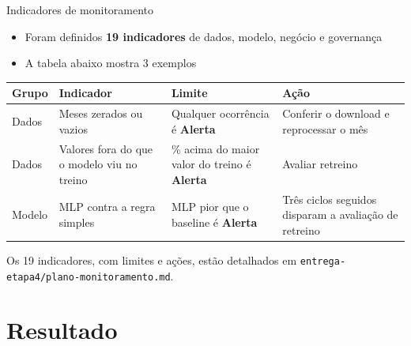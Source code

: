 \documentclass[aspectratio=169,10pt]{beamer}
\newcommand{\chave}[1]{\textcolor{dcblue}{\textbf{#1}}}
\newcommand{\nota}[1]{{\color{dcgreydark}\scriptsize #1\par}}
\newcommand{\alerta}{\textcolor{nivelalerta}{\textbf{Alerta}}}
\begin{document}
\begin{frame}{Indicadores de monitoramento}
  \vfill
  \setlength{\leftmargini}{0.9em}
  \begin{itemize}
    \setlength{\itemsep}{4pt}
    \item Foram definidos \chave{19 indicadores} de dados, modelo, negócio e governança
    \item A tabela abaixo mostra 3 exemplos
  \end{itemize}
  \vfill
  \small
  \renewcommand{\arraystretch}{1.4}
  \begin{tabular}{@{}l>{\raggedright\arraybackslash}p{}>{\raggedright\arraybackslash}p{}>{\raggedright\arraybackslash}p{}@{}}
    \toprule
    \textbf{Grupo} & \textbf{Indicador} & \textbf{Limite} & \textbf{Ação} \\
    \midrule
    Dados & Meses zerados ou vazios & Qualquer ocorrência é \alerta & Conferir o download e reprocessar o mês \\
    Dados & Valores fora do que o modelo viu no treino & 10\% acima do maior valor do treino é \alerta & Avaliar retreino \\
    Modelo & MLP contra a regra simples & MLP pior que o baseline é \alerta & Três ciclos seguidos disparam a avaliação de retreino \\
    \bottomrule
  \end{tabular}\par
  \vspace{0.25cm}
  \nota{Os 19 indicadores, com limites e ações, estão detalhados em \texttt{entrega-etapa4/plano-monitoramento.md}.}
  \vfill
\end{frame}

\section{Resultado}
\end{document}
